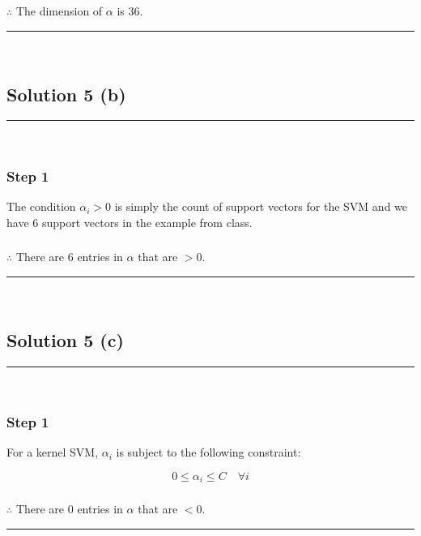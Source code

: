 \documentclass{article}
\begin{document}
\subsubsection*{\normalfont}{$\therefore$ The dimension of $\alpha$ is 36.}

\noindent\rule{\textwidth}{0.4pt}\\

\newpage



\subsection*{Solution 5 (b)}
\noindent\rule{\textwidth}{0.4pt}\\

\subsubsection*{Step 1}
\parbox{\textwidth}{
The condition $\alpha_i > 0$ is simply the count of support vectors for the SVM and we have 6 support vectors in the example from class.
}
\subsubsection*{\normalfont}{$\therefore$ There are 6 entries in $\alpha$ that are $> 0$.}

\noindent\rule{\textwidth}{0.4pt}\\

\newpage

\subsection*{Solution 5 (c)}
\noindent\rule{\textwidth}{0.4pt}\\

\subsubsection*{Step 1}
\parbox{\textwidth}{
For a kernel SVM, $\alpha_i$ is subject to the following constraint:

$$0 \leq \alpha_i \leq C \quad \forall i$$
}

\subsubsection*{\normalfont}{$\therefore$ There are 0 entries in $\alpha$ that are $< 0$.}

\noindent\rule{\textwidth}{0.4pt}\\
\end{document}
